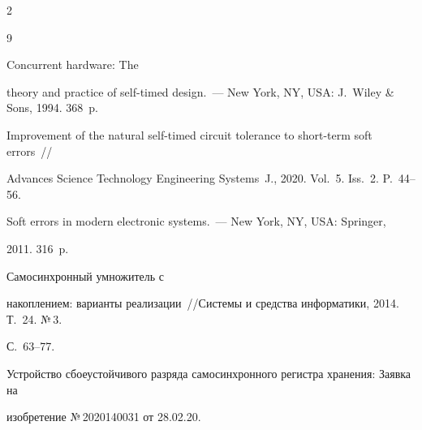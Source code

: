 \begin{multicols}{2}
{{\begin{thebibliography}{9}
 

 \vspace*{-2pt}

  


   Concurrent hardware: The 

theory and practice of self-timed design.~--- New York, NY, USA: J.~Wiley \& Sons, 1994. 368~p.


   Improvement of the natural self-timed circuit tolerance to short-term soft errors~// 

Advances Science Technology Engineering Systems~J., 2020. Vol.~5. Iss.~2. P.~44--56.


   Soft errors in modern electronic systems.~--- New York, NY, USA: Springer, 

2011. 316~p.


   Самосинхронный умножитель с 

накоплением: варианты реализации~//\linebreak Системы и средства информатики, 2014. Т.~24. №\,3. 

С.~63--77.



 Устройство сбоеустойчивого разряда самосинхронного регистра хранения: Заявка на 

изобретение №\,2020140031 от 28.02.20.

\end{thebibliography}



 }

 }



\end{multicols}



\vspace*{-8pt}



